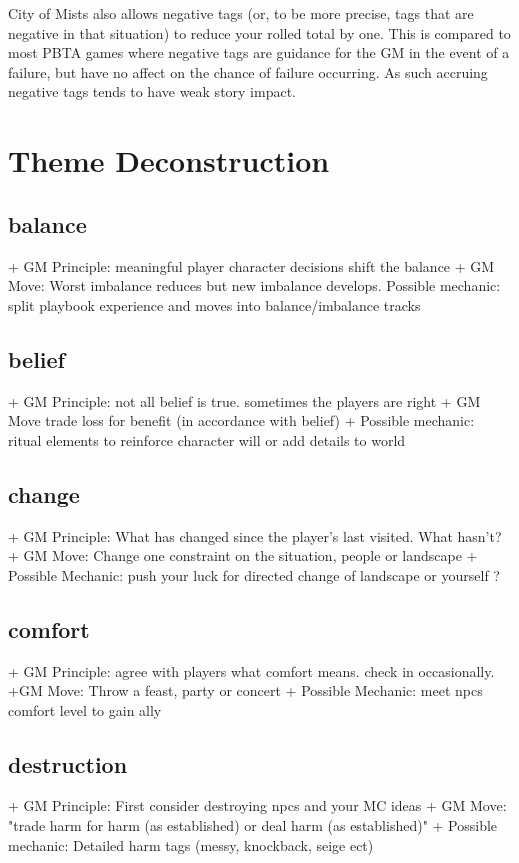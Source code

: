 \documentclass{tufte-handout}
\begin{document}
City of Mists also allows negative tags (or, to be more precise, tags that are negative in that situation) to reduce your rolled total by one. This is compared to most PBTA games where negative tags are guidance for the GM in the event of a failure, but have no affect on the chance of failure occurring. As such accruing negative tags tends to have weak story impact. 



\section{Theme Deconstruction}
\begin{multicols}{2}
\subsection{balance}
+ GM Principle: meaningful player character decisions shift the balance
+ GM Move: Worst imbalance reduces but new imbalance develops.	
Possible mechanic: split playbook experience and moves into balance/imbalance tracks

\subsection{belief}
+ GM Principle: not all belief is true. sometimes the players are right
+ GM Move trade loss for benefit (in accordance with belief)
+ Possible mechanic: ritual elements to reinforce character will or add details to world

\subsection{change}
+ GM Principle: What has changed since the player's last visited. What hasn't?	
+ GM Move: Change one constraint on the situation, people or landscape
+ Possible Mechanic: push your luck for directed change of landscape or yourself ?

\subsection{comfort}
+ GM Principle: agree with players what comfort means. check in occasionally.
+GM Move: Throw a feast, party or concert
+ Possible Mechanic: meet npcs comfort level to gain ally

\subsection{destruction }
+ GM Principle: First consider destroying npcs and your MC ideas	
+ GM Move: "trade harm for harm (as established) or deal harm (as established)"	
+ Possible mechanic: Detailed harm tags (messy, knockback, seige ect)



\end{multicols}
\end{document}
